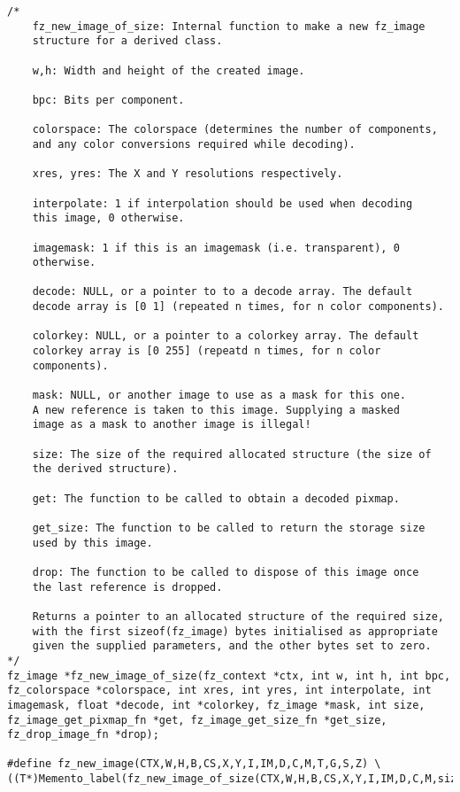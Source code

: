 \documentclass[oneside]{book}
\begin{document}
\begin{lstlisting}
/*
	fz_new_image_of_size: Internal function to make a new fz_image
	structure for a derived class.

	w,h: Width and height of the created image.

	bpc: Bits per component.

	colorspace: The colorspace (determines the number of components,
	and any color conversions required while decoding).

	xres, yres: The X and Y resolutions respectively.

	interpolate: 1 if interpolation should be used when decoding
	this image, 0 otherwise.

	imagemask: 1 if this is an imagemask (i.e. transparent), 0
	otherwise.

	decode: NULL, or a pointer to to a decode array. The default
	decode array is [0 1] (repeated n times, for n color components).

	colorkey: NULL, or a pointer to a colorkey array. The default
	colorkey array is [0 255] (repeatd n times, for n color
	components).

	mask: NULL, or another image to use as a mask for this one.
	A new reference is taken to this image. Supplying a masked
	image as a mask to another image is illegal!

	size: The size of the required allocated structure (the size of
	the derived structure).

	get: The function to be called to obtain a decoded pixmap.

	get_size: The function to be called to return the storage size
	used by this image.

	drop: The function to be called to dispose of this image once
	the last reference is dropped.

	Returns a pointer to an allocated structure of the required size,
	with the first sizeof(fz_image) bytes initialised as appropriate
	given the supplied parameters, and the other bytes set to zero.
*/
fz_image *fz_new_image_of_size(fz_context *ctx, int w, int h, int bpc, fz_colorspace *colorspace, int xres, int yres, int interpolate, int imagemask, float *decode, int *colorkey, fz_image *mask, int size, fz_image_get_pixmap_fn *get, fz_image_get_size_fn *get_size, fz_drop_image_fn *drop);

#define fz_new_image(CTX,W,H,B,CS,X,Y,I,IM,D,C,M,T,G,S,Z) \
((T*)Memento_label(fz_new_image_of_size(CTX,W,H,B,CS,X,Y,I,IM,D,C,M,sizeof(T),G,S,Z),#T))
\end{lstlisting}
\end{document}
